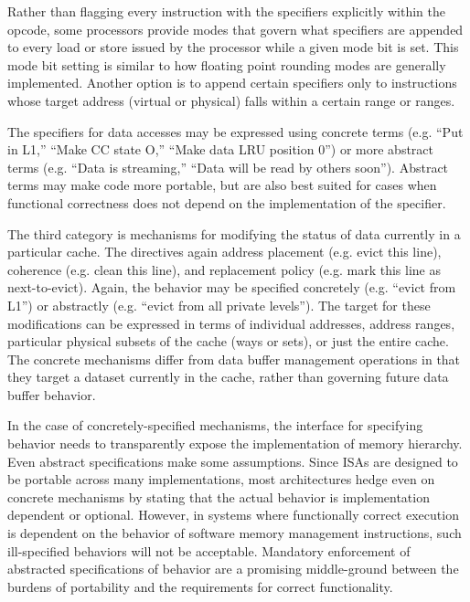 Rather than flagging every instruction with the specifiers explicitly within the opcode, some processors provide modes that govern what specifiers are appended to every load or store issued by the processor while a given mode bit is set. This mode bit setting is similar to how floating point rounding modes are generally implemented. Another option is to append certain specifiers only to instructions whose target address (virtual or physical) falls within a certain range or ranges.

The specifiers for data accesses may be expressed using concrete terms (e.g. ``Put in L1,'' ``Make CC state O,'' ``Make data LRU position 0'') or more abstract terms (e.g. ``Data is streaming,'' ``Data will be read by others soon''). Abstract terms may make code more portable, but are also best suited for cases when functional correctness does not depend on the implementation of the specifier.

The third category is mechanisms for modifying the status of data currently in a particular cache. The directives again address placement (e.g. evict this line), coherence (e.g. clean this line), and replacement policy (e.g. mark this line as next-to-evict). Again, the behavior may be specified concretely (e.g. ``evict from L1'') or abstractly (e.g. ``evict from all private levels''). The target for these modifications can be expressed in terms of individual addresses, address ranges, particular physical subsets of the cache (ways or sets), or just the entire cache.  The concrete mechanisms differ from data buffer management operations in that they target a dataset currently in the cache, rather than governing future data buffer behavior.

In the case of concretely-specified mechanisms, the interface for specifying behavior needs to transparently expose the implementation of memory hierarchy. Even abstract specifications make some assumptions. Since ISAs are designed to be portable across many implementations, most architectures hedge even on concrete mechanisms by stating that the actual behavior is implementation dependent or optional. However, in systems where functionally correct execution is dependent on the behavior of software memory management instructions, such ill-specified behaviors will not be acceptable. Mandatory enforcement of abstracted specifications of behavior are a promising middle-ground between the burdens of portability and the requirements for correct functionality. 


